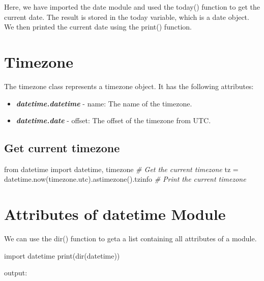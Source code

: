 \documentclass[11pt]{article}
\newenvironment{Shaded}{}{}
\newcommand{\CommentTok}[1]{\textcolor[rgb]{0.38,0.63,0.69}{\textit{{#1}}}}
\newcommand{\NormalTok}[1]{{#1}}
\newcommand{\ImportTok}[1]{{#1}}
\newcommand{\OperatorTok}[1]{\textcolor[rgb]{0.40,0.40,0.40}{{#1}}}
\newcommand{\BuiltInTok}[1]{{#1}}
\begin{document}
Here, we have imported the date module and used the today() function to
get the current date. The result is stored in the today variable, which
is a date object. We then printed the current date using the print()
function.

\section{Timezone}
The timezone class represents a timezone object. It has the following attributes: 


\begin{itemize}
\item \textbf{\emph{datetime.datetime}} - name: The name of the timezone. 
\item \textbf{\emph{datetime.date}} - offset: The offset of the timezone from UTC.
\end{itemize}





\subsection{Get current timezone}
\begin{Shaded}
\begin{Highlighting}[]
\ImportTok{from}\NormalTok{ datetime }\ImportTok{import}\NormalTok{ datetime, timezone}
\CommentTok{\# Get the current timezone}
\NormalTok{tz }\OperatorTok{=}\NormalTok{ datetime.now(timezone.utc).astimezone().tzinfo}
\CommentTok{\# Print the current timezone}
\end{Highlighting}
\end{Shaded}

\section{Attributes of datetime Module}

We can use the dir() function to geta a list containing all attributes
of a module.

\begin{Shaded}
\begin{Highlighting}[]
\ImportTok{import}\NormalTok{ datetime}
\BuiltInTok{print}\NormalTok{(}\BuiltInTok{dir}\NormalTok{(datetime))}
\end{Highlighting}
\end{Shaded}

output:
\end{document}
